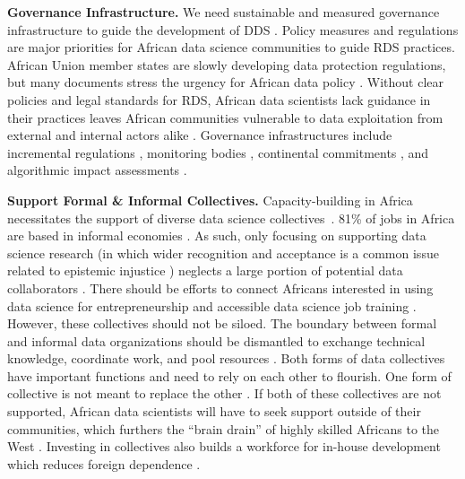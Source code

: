 \textbf{Governance Infrastructure.}
We need sustainable and measured governance infrastructure to guide the development of DDS \cite{african_union2024continental, chan2021limits}. Policy measures and regulations are major priorities for African data science communities to guide RDS practices. African Union member states are slowly developing data protection regulations, but many documents stress the urgency for African data policy \cite{kiemde2022towards, plantinga2024responsible}.
Without clear policies and legal standards for RDS, African data scientists lack guidance in their practices leaves African communities vulnerable to data exploitation from external and internal actors alike \cite{abebe2021narratives,cisse2018look, mandaza2004reconciliationzimbabwe}. 
Governance infrastructures include incremental regulations \cite{gwagwa2019recommendations}, monitoring bodies \cite{goffi2023teaching}, continental commitments \cite{african_union2024continental}, and algorithmic impact assessments \cite{sinha2023principlesafrofeminist}. 


\textbf{Support Formal \& Informal Collectives.}
Capacity-building in Africa necessitates the support of diverse data science collectives~\cite{okolo2023responsible, abebe2021narratives}. 
81\% of jobs in Africa are based in informal economies \cite{shilongo2023creativity}. As such, only focusing on supporting data science research (in which wider recognition and acceptance is a common issue related to epistemic injustice \cite{eke2022forgotten,chan2021limits}) neglects a large portion of potential data collaborators \cite{hountondji2004producing}. There should be efforts to connect Africans interested in using data science for entrepreneurship \cite{biko2004black,shilongo2023creativity} and accessible data science job training \cite{abebe2021narratives}. However, these collectives should not be siloed. The boundary between formal and informal data organizations should be dismantled to exchange technical knowledge, coordinate work, and pool resources \cite{dieng2023speaking, kling2023role}. 
Both forms of data collectives have important functions and need to rely on each other to flourish. One form of collective is not meant to replace the other \cite{osaghae2004rescuing}. If both of these collectives are not supported, African data scientists will have to seek support outside of their communities, which furthers the ``brain drain'' of highly skilled Africans to the West \cite{okolo2023responsible}. Investing in collectives also builds a workforce for in-house development which reduces foreign dependence \cite{kiemde2022towards, carman2023applying, plantinga2024responsible}. 


